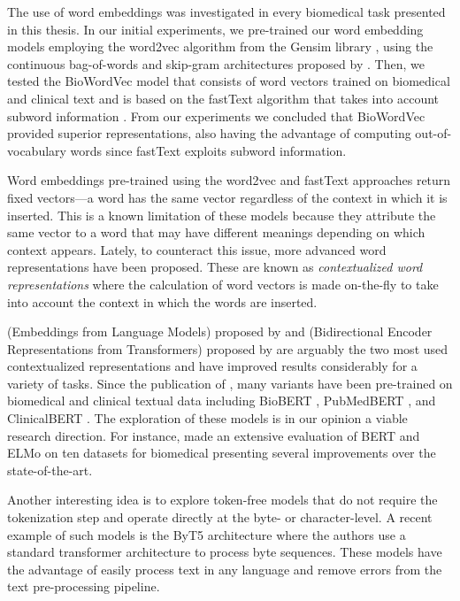 The use of word embeddings was investigated in every biomedical  task presented in this thesis.
In our initial experiments, we pre-trained our word embedding models employing the word2vec algorithm from the Gensim library \parencite{rehurek2010a}, using the continuous bag-of-words and skip-gram architectures proposed by \textcite{mikolov2013b}.
Then, we tested the BioWordVec model \parencite{chen2019g} that consists of word vectors trained on biomedical and clinical text and is based on the fastText algorithm that takes into account subword information \parencite{bojanowski2017a}.
From our experiments we concluded that BioWordVec provided superior representations, also having the advantage of computing out-of-vocabulary words since fastText exploits subword information.

Word embeddings pre-trained using the word2vec and fastText approaches return fixed vectors---a word has the same vector regardless of the context in which it is inserted.
This is a known limitation of these models because they attribute the same vector to a word that may have different meanings depending on which context appears.
Lately, to counteract this issue, more advanced word representations have been proposed.
These are known as \textit{contextualized word representations} where the calculation of word vectors is made on-the-fly to take into account the context in which the words are inserted.

 (Embeddings from Language Models) proposed by \textcite{peters2018a} and
 (Bidirectional Encoder Representations from Transformers) proposed by \textcite{devlin2019a} are arguably the two most used contextualized representations and have improved results considerably for a variety of  tasks.
Since the publication of , many variants have been pre-trained on biomedical and clinical textual data including BioBERT \parencite{lee2020a}, PubMedBERT \parencite{gu2021a}, and ClinicalBERT \parencite{alsentzer2019a,huang2019c}.
The exploration of these models is in our opinion a viable research direction.
For instance, \textcite{peng2019a} made an extensive evaluation of BERT and ELMo on ten datasets for biomedical  presenting several improvements over the state-of-the-art.

Another interesting idea is to explore token-free models that do not require the tokenization step and operate directly at the byte- or character-level.
A recent example of such models is the ByT5 architecture \parencite{xue2021b} where the authors use a standard transformer architecture to process byte sequences.
These models have the advantage of easily process text in any language and remove errors from the text pre-processing pipeline.

